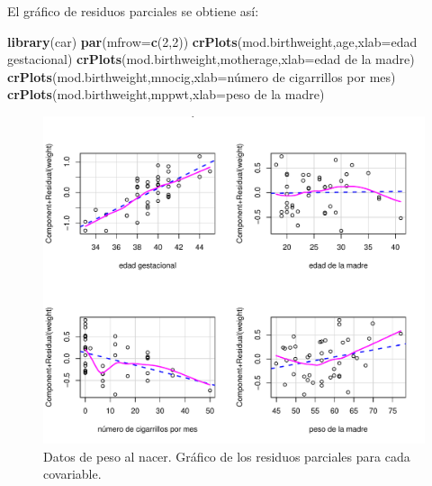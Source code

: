 \documentclass[
]{article}
\newenvironment{Shaded}{\begin{snugshade}}{\end{snugshade}}
\newcommand{\AttributeTok}[1]{\textcolor[rgb]{0.13,0.29,0.53}{#1}}
\newcommand{\DecValTok}[1]{\textcolor[rgb]{0.00,0.00,0.81}{#1}}
\newcommand{\FunctionTok}[1]{\textcolor[rgb]{0.13,0.29,0.53}{\textbf{#1}}}
\newcommand{\NormalTok}[1]{#1}
\newcommand{\StringTok}[1]{\textcolor[rgb]{0.31,0.60,0.02}{#1}}
\begin{document}
El gráfico de residuos parciales se obtiene así:

\begin{Shaded}
\begin{Highlighting}[]
\FunctionTok{library}\NormalTok{(car)}
\FunctionTok{par}\NormalTok{(}\AttributeTok{mfrow=}\FunctionTok{c}\NormalTok{(}\DecValTok{2}\NormalTok{,}\DecValTok{2}\NormalTok{))}
\FunctionTok{crPlots}\NormalTok{(mod.birthweight,}\StringTok{\textquotesingle{}age\textquotesingle{}}\NormalTok{,}\AttributeTok{xlab=}\StringTok{\textquotesingle{}edad gestacional\textquotesingle{}}\NormalTok{)}
\FunctionTok{crPlots}\NormalTok{(mod.birthweight,}\StringTok{\textquotesingle{}motherage\textquotesingle{}}\NormalTok{,}\AttributeTok{xlab=}\StringTok{\textquotesingle{}edad de la madre\textquotesingle{}}\NormalTok{)}
\FunctionTok{crPlots}\NormalTok{(mod.birthweight,}\StringTok{\textquotesingle{}mnocig\textquotesingle{}}\NormalTok{,}\AttributeTok{xlab=}\StringTok{\textquotesingle{}número de cigarrillos por mes\textquotesingle{}}\NormalTok{)}
\FunctionTok{crPlots}\NormalTok{(mod.birthweight,}\StringTok{\textquotesingle{}mppwt\textquotesingle{}}\NormalTok{,}\AttributeTok{xlab=}\StringTok{\textquotesingle{}peso de la madre\textquotesingle{}}\NormalTok{)}
\end{Highlighting}
\end{Shaded}

\begin{figure}

{\centering \includegraphics{MLG1_files/figure-latex/residuosBWdata2-1} 

}

\caption{Datos de peso al nacer. Gráfico de los residuos parciales para cada covariable.}\label{fig:residuosBWdata2}
\end{figure}
\end{document}
